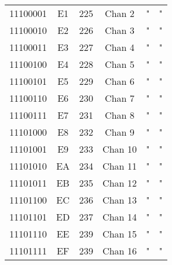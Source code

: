 \begin{center}
\begin{supertabular}{| c | c | c | c | c | c |}
                11100001 & E1 & 225 & Chan 2   &                   "                              &                   "                            \\
             11100010 & E2 & 226 & Chan 3   &                   "                              &                   "                            \\
                11100011 & E3 & 227 & Chan 4   &                   "                              &                   "                            \\
             11100100 & E4 & 228 & Chan 5   &                   "                              &                   "                            \\
                11100101 & E5 & 229 & Chan 6   &                   "                              &                   "                            \\
             11100110 & E6 & 230 & Chan 7   &                   "                              &                   "                            \\
                11100111 & E7 & 231 & Chan 8   &                   "                              &                   "                            \\
             11101000 & E8 & 232 & Chan 9   &                   "                              &                   "                            \\
                11101001 & E9 & 233 & Chan 10  &                   "                              &                   "                            \\
             11101010 & EA & 234 & Chan 11  &                   "                              &                   "                            \\
                11101011 & EB & 235 & Chan 12  &                   "                              &                   "                            \\
             11101100 & EC & 236 & Chan 13  &                   "                              &                   "                            \\
                11101101 & ED & 237 & Chan 14  &                   "                              &                   "                            \\
             11101110 & EE & 239 & Chan 15  &                   "                              &                   "                            \\
                11101111 & EF & 239 & Chan 16  &                   "                              &                   "                            \\
        \end{supertabular}
        \end{center}

